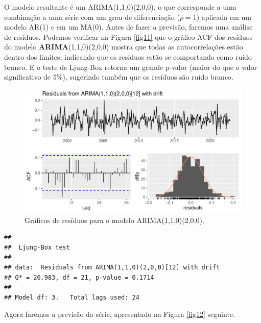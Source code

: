 \documentclass[
	12pt,				%
	openright,			%
	oneside,      %
	a4paper,			%
	english,			%
	french,				%
	spanish,			%
	brazil,				%
	]{abntex2}\usepackage[]{graphicx}\usepackage[table]{xcolor}
\makeatletter
\def\maxwidth{ %
  \ifdim\Gin@nat@width>\linewidth
    \linewidth
  \else
    \Gin@nat@width
  \fi
}
\newenvironment{kframe}{%
 \def\at@end@of@kframe{}%
 \ifinner\ifhmode%
  \def\at@end@of@kframe{\end{minipage}}%
  \begin{minipage}{\columnwidth}%
 \fi\fi%
 \def\FrameCommand##1{\hskip\@totalleftmargin \hskip-\fboxsep
 \colorbox{shadecolor}{##1}\hskip-\fboxsep
     \hskip-\linewidth \hskip-\@totalleftmargin \hskip\columnwidth}%
 \MakeFramed {\advance\hsize-\width
   \@totalleftmargin\z@ \linewidth\hsize
   \@setminipage}}%
 {\par\unskip\endMakeFramed%
 \at@end@of@kframe}
\newenvironment{knitrout}{}{} %
\theoremstyle{definition}
\theoremstyle{remark}
\makeatother
\begin{document}
O modelo resultante é um ARIMA(1,1,0)(2,0,0), o que corresponde a uma combinação a uma série com um grau de diferenciação ($p = 1$) aplicada em um modelo AR(1) e em um MA(0). Antes de fazer a previsão, faremos uma análise de resíduos. Podemos verificar na Figura \ref{fig11} que o gráfico ACF dos resíduos do modelo \textbf{ARIMA}(1,1,0)(2,0,0) mostra que todas as autocorrelações estão dentro dos limites, indicando que os resíduos estão se comportando como ruído branco. E o teste de Ljung-Box retorna um grande p-valor (maior do que o valor significativo de 5\%), sugerindo também que os resíduos são ruído branco. 

\begin{knitrout}
\color{fgcolor}\begin{figure}
\includegraphics[width=\maxwidth]{figure/script11-1} \caption[Gráficos de resíduos para o modelo ARIMA(1,1,0)(2,0,0)]{Gráficos de resíduos para o modelo ARIMA(1,1,0)(2,0,0).\label{fig11}}\label{fig:script11}
\end{figure}

\begin{kframe}\begin{verbatim}
## 
## 	Ljung-Box test
## 
## data:  Residuals from ARIMA(1,1,0)(2,0,0)[12] with drift
## Q* = 26.983, df = 21, p-value = 0.1714
## 
## Model df: 3.   Total lags used: 24
\end{verbatim}
\end{kframe}
\end{knitrout}


Agora faremos a previsão da série, apresentado na Figura \ref{fig12} seguinte.
\end{document}
